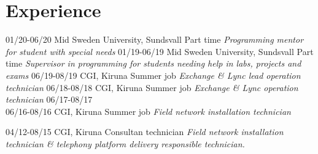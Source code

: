 \section{Experience}

\begin{entrylist}
  \entry
    {01/20-06/20}
    {Mid Sweden University, Sundsvall}
    {Part time}
    {\emph{Programming mentor for student with special needs}}
  \entry
    {01/19-06/19}
    {Mid Sweden University, Sundsvall}
    {Part time}
    {\emph{Supervisor in programming for students needing help in labs, projects and \\ exams}}
  \entry
    {06/19-08/19}
    {CGI, Kiruna}
    {Summer job}
    {\emph{Exchange \& Lync lead operation technician}}
  \entry
    {06/18-08/18}
    {CGI, Kiruna}
    {Summer job}
    {\emph{Exchange \& Lync operation technician}}
  \entry
    {06/17-08/17 \\ 06/16-08/16}
    {CGI, Kiruna}
    {Summer job}
    {\emph{Field network installation technician}}

  \entry
    {04/12-08/15}
    {CGI, Kiruna}
    {Consultan technician}
    {\emph{Field network installation technician \& telephony platform delivery responsible technician.}}
\end{entrylist}
